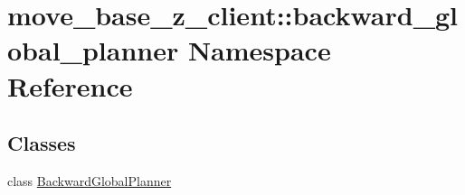 \hypertarget{namespacemove__base__z__client_1_1backward__global__planner}{}\section{move\+\_\+base\+\_\+z\+\_\+client\+:\+:backward\+\_\+global\+\_\+planner Namespace Reference}
\label{namespacemove__base__z__client_1_1backward__global__planner}
\subsection*{Classes}
\begin{DoxyCompactItemize}
\item 
class \hyperlink{classmove__base__z__client_1_1backward__global__planner_1_1BackwardGlobalPlanner}{Backward\+Global\+Planner}
\end{DoxyCompactItemize}
